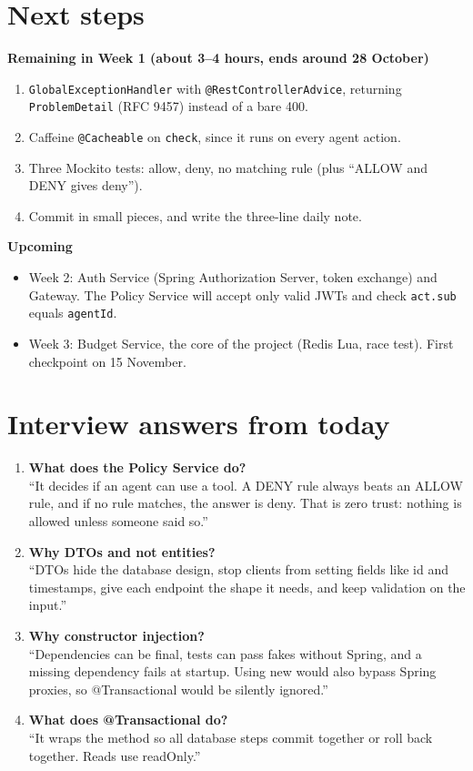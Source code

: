 \documentclass[11pt,a4paper]{article}
\newcommand{\code}[1]{\texttt{\small #1}}
\begin{document}
\section{Next steps}

\textbf{Remaining in Week 1 (about 3--4 hours, ends around 28 October)}
\begin{enumerate}
  \item \code{GlobalExceptionHandler} with \code{@RestControllerAdvice}, returning \code{ProblemDetail} (RFC 9457) instead of a bare 400.
  \item Caffeine \code{@Cacheable} on \code{check}, since it runs on every agent action.
  \item Three Mockito tests: allow, deny, no matching rule (plus ``ALLOW and DENY gives deny'').
  \item Commit in small pieces, and write the three-line daily note.
\end{enumerate}

\textbf{Upcoming}
\begin{itemize}
  \item Week 2: Auth Service (Spring Authorization Server, token exchange) and Gateway. The Policy Service will accept only valid JWTs and check \code{act.sub} equals \code{agentId}.
  \item Week 3: Budget Service, the core of the project (Redis Lua, race test). First checkpoint on 15 November.
\end{itemize}

\section{Interview answers from today}

\begin{enumerate}
  \item \textbf{What does the Policy Service do?}\\
  ``It decides if an agent can use a tool. A DENY rule always beats an ALLOW rule, and if no rule matches, the answer is deny. That is zero trust: nothing is allowed unless someone said so.''
  \item \textbf{Why DTOs and not entities?}\\
  ``DTOs hide the database design, stop clients from setting fields like id and timestamps, give each endpoint the shape it needs, and keep validation on the input.''
  \item \textbf{Why constructor injection?}\\
  ``Dependencies can be final, tests can pass fakes without Spring, and a missing dependency fails at startup. Using new would also bypass Spring proxies, so @Transactional would be silently ignored.''
  \item \textbf{What does @Transactional do?}\\
  ``It wraps the method so all database steps commit together or roll back together. Reads use readOnly.''
\end{enumerate}
\end{document}

